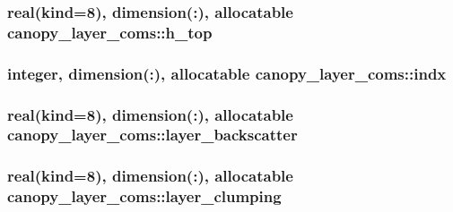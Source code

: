 \subsubsection[{\texorpdfstring{h\+\_\+top}{h_top}}]{\setlength{\rightskip}{0pt plus 5cm}real(kind=8), dimension(\+:), allocatable canopy\+\_\+layer\+\_\+coms\+::h\+\_\+top}\hypertarget{namespacecanopy__layer__coms_a16fa644c3a2ec33a530019e5b5caf16c}{}\label{namespacecanopy__layer__coms_a16fa644c3a2ec33a530019e5b5caf16c}
\subsubsection[{\texorpdfstring{indx}{indx}}]{\setlength{\rightskip}{0pt plus 5cm}integer, dimension(\+:), allocatable canopy\+\_\+layer\+\_\+coms\+::indx}\hypertarget{namespacecanopy__layer__coms_a05783dc93acf323347d52ae93a1b5857}{}\label{namespacecanopy__layer__coms_a05783dc93acf323347d52ae93a1b5857}
\subsubsection[{\texorpdfstring{layer\+\_\+backscatter}{layer_backscatter}}]{\setlength{\rightskip}{0pt plus 5cm}real(kind=8), dimension(\+:), allocatable canopy\+\_\+layer\+\_\+coms\+::layer\+\_\+backscatter}\hypertarget{namespacecanopy__layer__coms_a12455d67a7344d67667413f7a371ba7a}{}\label{namespacecanopy__layer__coms_a12455d67a7344d67667413f7a371ba7a}
\subsubsection[{\texorpdfstring{layer\+\_\+clumping}{layer_clumping}}]{\setlength{\rightskip}{0pt plus 5cm}real(kind=8), dimension(\+:), allocatable canopy\+\_\+layer\+\_\+coms\+::layer\+\_\+clumping}\hypertarget{namespacecanopy__layer__coms_a3bb08434b8bb97d6c0b52e6b39189730}{}\label{namespacecanopy__layer__coms_a3bb08434b8bb97d6c0b52e6b39189730}
